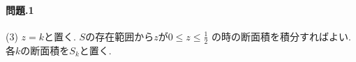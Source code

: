 \documentclass[11pt]{jarticle}
\begin{document}
\title{}
\date{}
\maketitle
\paragraph{問題.1}
(3) $z=k$と置く. $S$の存在範囲から$z$が$0\leq z \leq \frac{1}{2}$
の時の断面積を積分すればよい. 各$k$の断面積を$S_k$と置く. 
\end{document}
